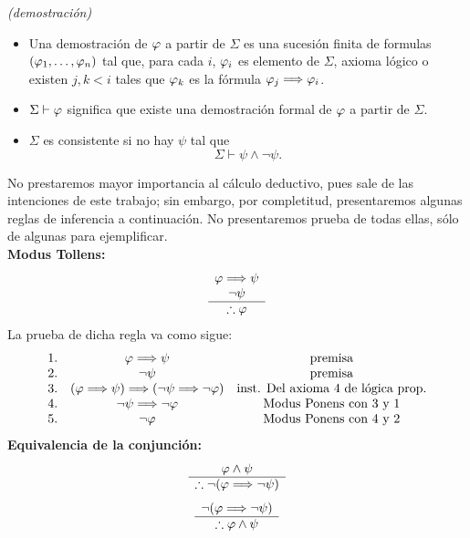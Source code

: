 \begin{defn} \textit{(demostración)}
    \begin{itemize}
        \item Una demostración de $\varphi$ a partir de $\Sigma$ es una sucesión finita de formulas $(\varphi_1,\ldots,\varphi_n)$ tal que, para cada $i$, $\varphi_i$ es elemento de $\Sigma$, axioma lógico o existen $j,k<i$ tales que $\varphi_k$ es la fórmula $\varphi_j\Longrightarrow\varphi_i$.
        \item $\Sigma\vdash\varphi$ significa que existe una demostración formal de $\varphi$ a partir de $\Sigma$.
        \item $\Sigma$ es consistente si no hay $\psi$ tal que 
        \[\Sigma\vdash\psi\land\neg\psi.\]
    \end{itemize}
\end{defn}
No prestaremos mayor importancia al cálculo deductivo, pues sale de las intenciones de este trabajo; sin embargo, por completitud, presentaremos algunas reglas de inferencia a continuación. No presentaremos prueba de todas ellas, sólo de algunas para ejemplificar.\\
\textbf{Modus Tollens:}
\[
    \begin{array}{c}
      \varphi \Longrightarrow \psi \\
      \neg\psi \\
      \hline
      \therefore \varphi
    \end{array}
\]
La prueba de dicha regla va como sigue:
\[
        \begin{array}{c c c}
            1. & \varphi\Longrightarrow\psi & \text{premisa}\\
            2. & \neg\psi & \text{premisa}\\
            3. & (\varphi\Longrightarrow\psi)\Longrightarrow(\neg\psi\Longrightarrow\neg\varphi) & \text{inst. Del axioma 4 de lógica prop.}\\
            4. & \neg\psi\Longrightarrow\neg\varphi & \text{Modus Ponens con 3 y 1}\\
            5. & \neg\varphi & \text{Modus Ponens con 4 y 2}
        \end{array}
    \]
\textbf{Equivalencia de la conjunción:}
\[
    \begin{array}{c}
      \varphi\land\psi\\
      \hline
      \therefore \neg(\varphi\Longrightarrow\neg\psi)
    \end{array}
\]
\[
    \begin{array}{c}
      \neg(\varphi\Longrightarrow\neg\psi)\\
      \hline
      \therefore \varphi\land\psi
    \end{array}
\]
